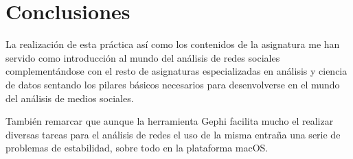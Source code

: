 \chapter{Conclusiones}

La realización de esta práctica así como los contenidos de la asignatura me han servido como introducción al mundo del análisis de redes sociales complementándose con el resto de asignaturas especializadas en análisis y ciencia de datos sentando los pilares básicos necesarios para desenvolverse en el mundo del análisis de medios sociales.

\bigskip
También remarcar que aunque la herramienta Gephi facilita mucho el realizar diversas tareas para el análisis de redes el uso de la misma entraña una serie de problemas de estabilidad, sobre todo en la plataforma macOS.

